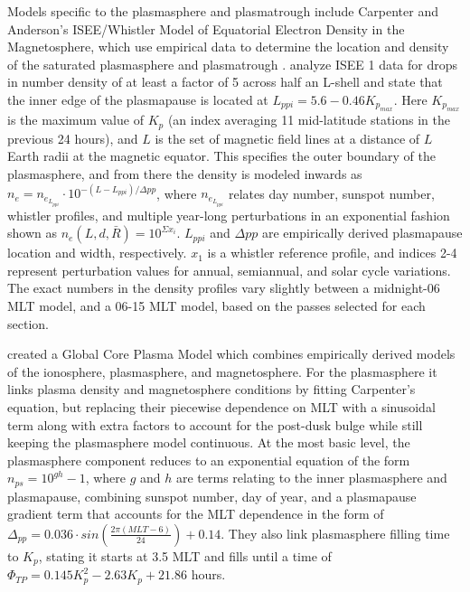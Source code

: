 Models specific to the plasmasphere and plasmatrough include Carpenter and Anderson's ISEE/Whistler Model of Equatorial Electron Density in the Magnetosphere, which use empirical data to determine the location and density of the saturated plasmasphere and plasmatrough \citep{Carpenter1992ISEEModel}. \cite{Carpenter1992ISEEModel} analyze ISEE 1 data for drops in number density of at least a factor of 5 across half an L-shell and state that the inner edge of the plasmapause is located at $L_{ppi}=5.6-0.46K_{p_{max}}$. Here $K_{p_{max}}$ is the maximum value of $K_p$ (an index averaging 11 mid-latitude stations in the previous 24 hours), and $L$ is the set of magnetic field lines at a distance of $L$ Earth radii at the magnetic equator. This specifies the outer boundary of the plasmasphere, and from there the density is modeled inwards as $n_e=n_{e_{L_{ppi}}}\cdot 10^{-(L-L_{ppi})/\Delta pp}$, where $n_{e_{L_{ppi}}}$ relates day number, sunspot number, whistler profiles, and multiple year-long perturbations in an exponential fashion shown as $n_e(L,d,\bar{R})=10^{\Sigma x_i}$. $L_{ppi}$ and $\Delta pp$ are empirically derived plasmapause location and width, respectively. $x_1$ is a whistler reference profile, and indices 2-4 represent perturbation values for annual, semiannual, and solar cycle variations. The exact numbers in the density profiles vary slightly between a midnight-06 MLT model, and a 06-15 MLT model, based on the passes selected for each section. 

\cite{Gallagher2000GlobalCore} created a Global Core Plasma Model which combines empirically derived models of the ionosphere, plasmasphere, and magnetosphere. For the plasmasphere it links plasma density and magnetosphere conditions by fitting Carpenter's equation, but replacing their piecewise dependence on MLT with a sinusoidal term along with extra factors to account for the post-dusk bulge while still keeping the plasmasphere model continuous. At the most basic level, the plasmasphere component reduces to an exponential equation of the form $n_{ps}=10^{gh}-1$, where $g$ and $h$ are terms relating to the inner plasmasphere and plasmapause, combining sunspot number, day of year, and a plasmapause gradient term that accounts for the MLT dependence in the form of $\Delta_{pp}=0.036\cdot sin(\frac{2\pi (MLT-6)}{24})+0.14$. They also link plasmasphere filling time to $K_p$, stating it starts at 3.5 MLT and fills until a time of $\Phi_{TP}=0.145K_p^2-2.63K_p+21.86$ hours\cite{Gallagher1995AzimuthalVariation}.

